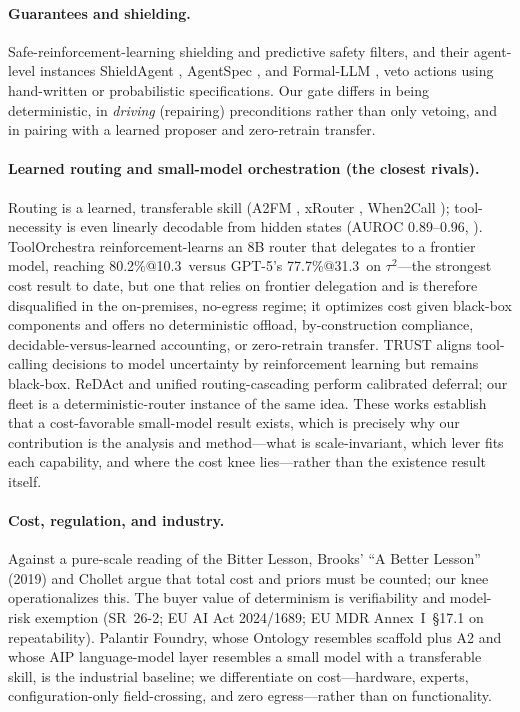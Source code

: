 \paragraph{Guarantees and shielding.} Safe-reinforcement-learning shielding \citep{ax1807_06096} and predictive safety filters, and their agent-level instances ShieldAgent \citep{ax2503_22738}, AgentSpec \citep{ax2503_18666}, and Formal-LLM \citep{ax2402_00798}, veto actions using hand-written or probabilistic specifications. Our gate differs in being deterministic, in \emph{driving} (repairing) preconditions rather than only vetoing, and in pairing with a learned proposer and zero-retrain transfer.

\paragraph{Learned routing and small-model orchestration (the closest rivals).} Routing is a learned, transferable skill (A2FM \citep{ax2510_12838}, xRouter \citep{ax2510_08439}, When2Call \citep{ax2504_18851}); tool-necessity is even linearly decodable from hidden states (AUROC 0.89--0.96, \citealp{ax2605_09252}). ToolOrchestra \citep{ax2511_21689} reinforcement-learns an 8B router that delegates to a frontier model, reaching 80.2\%@10.3\textcent\ versus GPT-5's 77.7\%@31.3\textcent\ on $\tau^2$---the strongest cost result to date, but one that relies on frontier delegation and is therefore disqualified in the on-premises, no-egress regime; it optimizes cost given black-box components and offers no deterministic offload, by-construction compliance, decidable-versus-learned accounting, or zero-retrain transfer. TRUST \citep{ax2606_06976} aligns tool-calling decisions to model uncertainty by reinforcement learning but remains black-box. ReDAct \citep{ax2604_07036} and unified routing-cascading \citep{ax2410_10347} perform calibrated deferral; our fleet is a deterministic-router instance of the same idea. These works establish that a cost-favorable small-model result exists, which is precisely why our contribution is the analysis and method---what is scale-invariant, which lever fits each capability, and where the cost knee lies---rather than the existence result itself.

\paragraph{Cost, regulation, and industry.} Against a pure-scale reading of the Bitter Lesson, Brooks' ``A Better Lesson'' (2019) and Chollet \citep{ax1911_01547} argue that total cost and priors must be counted; our knee operationalizes this. The buyer value of determinism is verifiability and model-risk exemption (SR~26-2; EU AI Act 2024/1689; EU MDR Annex~I~\S17.1 on repeatability). Palantir Foundry, whose Ontology resembles scaffold plus A2 and whose AIP language-model layer resembles a small model with a transferable skill, is the industrial baseline; we differentiate on cost---hardware, experts, configuration-only field-crossing, and zero egress---rather than on functionality.

